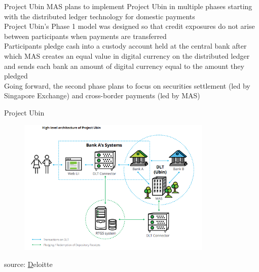 \documentclass[11pt]{beamer}
\begin{document}
\begin{frame}{Project Ubin}
	MAS plans to implement Project Ubin in multiple phases starting with the distributed ledger technology for domestic payments\\ \vspace{3mm}
	Project Ubin's Phase 1 model was designed so that credit exposures do not arise between participants when payments are transferred\\ \vspace{3mm}
	Participants pledge cash into a custody account held at the central bank after which MAS creates an equal value in digital currency on the distributed ledger and sends each bank an amount of digital currency equal to the amount they pledged\\ \vspace{3mm}
	Going forward, the second phase plans to focus on securities settlement (led by Singapore Exchange) and cross-border payments (led by MAS)
\end{frame}



\begin{frame}{Project Ubin}
	\begin{figure}[]
		\centering
		\includegraphics  [width=93mm]{Images/ubin}
	\end{figure}
	\begin{scriptsize}
		source: \href{http://www.mas.gov.sg/~/media/ProjectUbin/Project\%20Ubin\%20\%20SGD\%20on\%20Distributed\%20Ledger.pdf}Deloitte
	\end{scriptsize}
\end{frame}
\end{document}

